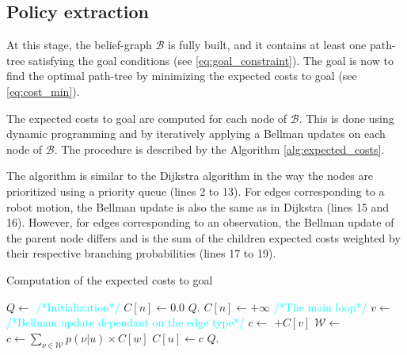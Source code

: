 \documentclass[letterpaper, 10 pt, conference]{ieeeconf}  %
\begin{document}
\subsection{Policy extraction}
\label{section:policy-extraction}

At this stage, the belief-graph $\mathcal{B}$ is fully built, and it contains at least one path-tree satisfying the goal conditions (see \ref{eq:goal_constraint}). The goal is now to find the optimal path-tree by minimizing the expected costs to goal (see \ref{eq:cost_min}).

The expected costs to goal are computed for each node of $\mathcal{B}$. This is done using dynamic programming and by iteratively applying a Bellman updates on each node of $\mathcal{B}$.
The procedure is described by the Algorithm \ref{alg:expected_costs}.

The algorithm is similar to the Dijkstra algorithm \cite{Sniedovich2006DijkstrasAR} in the way the nodes are prioritized using a priority queue (lines 2 to 13). For edges corresponding to a robot motion, the Bellman update is also the same as in Dijkstra (lines 15 and 16). However, for edges corresponding to an observation, the Bellman update of the parent node differs and is the sum of the children expected costs weighted by their respective branching probabilities (lines 17 to 19).
\begin{algorithm}[H]
\caption{Computation of the expected costs to goal}
\label{alg:expected_costs}
\begin{algorithmic}[1]
	\State $Q \gets $ 
	\State \textcolor{cyan}{\footnotesize/*Initialization*/}
			\State $C[n] \gets 0.0$
			\State $Q$.
		\Else
			\State $C[n] \gets +\infty$
		\EndIf
	\EndFor
	\State \textcolor{cyan}{\footnotesize/*The main loop*/}
		\State $v \gets$ 
			\State \textcolor{cyan}{\footnotesize/*Bellman update dependant on the edge type*/}
				\State $c \gets$ $+ C[v]$
				\State $\mathcal{W} \gets $ 
				\State $c \gets \sum_{\nu \in \mathcal{W}}{ p(\nu | u) \times C[w]} $
			\EndIf
				\State $C[u] \gets c$
				\State $Q$.
			\EndIf
		\EndFor
	\EndWhile
\EndFunction
\end{algorithmic}
\end{algorithm}
\end{document}
